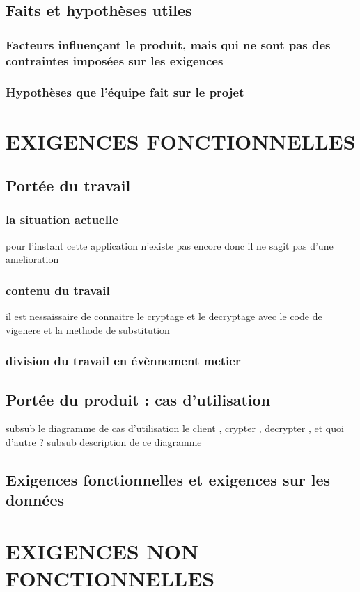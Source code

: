 \documentclass[a4]{article}
\begin{document}
		\subsection{Faits et hypothèses utiles}	
			\subsubsection{Facteurs influençant le produit, mais qui ne sont pas des contraintes imposées sur les exigences}
			\subsubsection{Hypothèses que l’équipe fait sur le projet}
	\section{EXIGENCES FONCTIONNELLES}
		\subsection{Portée du travail}
			\subsubsection{la situation actuelle}
				pour l'instant cette application n'existe pas encore 
				donc il ne sagit pas d'une amelioration
			\subsubsection{contenu du travail}
				il est nessaissaire de connaitre le cryptage et le decryptage avec 
				le code de vigenere et la methode de substitution
			\subsubsection{division du travail en évènnement metier}
		\subsection{Portée du produit : cas d’utilisation}
			subsub
				le diagramme de cas d'utilisation
				le client , crypter , decrypter , et quoi d'autre ?
			subsub 
				description de ce diagramme
		\subsection{Exigences fonctionnelles et exigences sur les données}
	\section{EXIGENCES NON FONCTIONNELLES}
\end{document}

